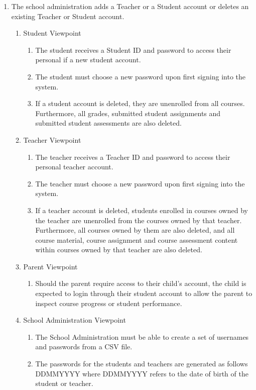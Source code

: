 \documentclass[]{article}
\begin{document}
\begin{enumerate}[{BE}1.]
	\item The school administration adds a Teacher or a Student account or deletes
an existing Teacher or Student account.
	\begin{enumerate}[{VP1}.1]
		\item Student Viewpoint
			\begin{enumerate}
				\item The student receives a Student ID and password to access their
personal if a new student account.
				\item The student must choose a new password upon first signing into the
system.
				\item If a student account is deleted, they are unenrolled from all courses.
Furthermore, all grades, submitted student assignments and submitted student
assessments are also deleted.
			\end{enumerate}
		\item Teacher Viewpoint
			\begin{enumerate}
				\item The teacher receives a Teacher ID and password to access their
personal teacher account.
				\item The teacher must choose a new password upon first signing into the
system.
				\item If a teacher account is deleted, students enrolled in courses owned by
the teacher are unenrolled from the courses owned by that teacher. Furthermore,
all courses owned by them are also deleted, and all course material, course
assignment and course assessment content within courses owned by that teacher
are also deleted.
			\end{enumerate}
		\item Parent Viewpoint
			\begin{enumerate}
				\item Should the parent require access to their child's account, the child
is expected to login through their student account to allow the parent to
inspect course progress or student performance.
			\end{enumerate}
		\item School Administration Viewpoint
			\begin{enumerate}
				\item The School Administration must be able to create a set of usernames
and passwords from a CSV file.
				\item The passwords for the students and teachers are generated as follows
DDMMYYYY where DDMMYYYY refers to the date of birth of the student or teacher.

\end{enumerate}
\end{enumerate}
\end{enumerate}
\end{document}
